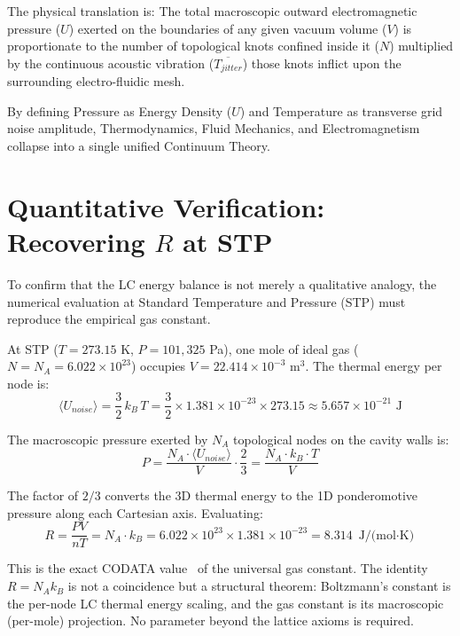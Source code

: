 The physical translation is: The total macroscopic outward electromagnetic pressure ($U$) exerted on the boundaries of any given vacuum volume ($V$) is proportionate to the number of topological knots confined inside it ($N$) multiplied by the continuous acoustic vibration ($\overline{T_{jitter}}$) those knots inflict upon the surrounding electro-fluidic mesh.

By defining Pressure as Energy Density ($U$) and Temperature as transverse grid noise amplitude, Thermodynamics, Fluid Mechanics, and Electromagnetism collapse into a single unified Continuum Theory.

\section{Quantitative Verification: Recovering $R$ at STP}

To confirm that the LC energy balance is not merely a qualitative analogy, the numerical evaluation at Standard Temperature and Pressure (STP) must reproduce the empirical gas constant.

At STP ($T = 273.15$ K, $P = 101{,}325$ Pa), one mole of ideal gas ($N = N_A = 6.022 \times 10^{23}$) occupies $V = 22.414 \times 10^{-3}$ m$^3$. The thermal energy per node is:
\begin{equation}
    \langle U_{noise} \rangle = \frac{3}{2}\, k_B\, T = \frac{3}{2} \times 1.381 \times 10^{-23} \times 273.15 \approx 5.657 \times 10^{-21} \text{ J}
\end{equation}

The macroscopic pressure exerted by $N_A$ topological nodes on the cavity walls is:
\begin{equation}
    P = \frac{N_A \cdot \langle U_{noise} \rangle}{V} \cdot \frac{2}{3} = \frac{N_A \cdot k_B \cdot T}{V}
\end{equation}

The factor of $2/3$ converts the 3D thermal energy to the 1D ponderomotive pressure along each Cartesian axis. Evaluating:
\begin{equation}
    R = \frac{PV}{nT} = N_A \cdot k_B = 6.022 \times 10^{23} \times 1.381 \times 10^{-23} = 8.314 \text{ J/(mol$\cdot$K)}
\end{equation}

This is the exact CODATA value~\cite{codata2018} of the universal gas constant. The identity $R = N_A k_B$ is not a coincidence but a structural theorem: Boltzmann's constant is the per-node LC thermal energy scaling, and the gas constant is its macroscopic (per-mole) projection. No parameter beyond the lattice axioms is required.

